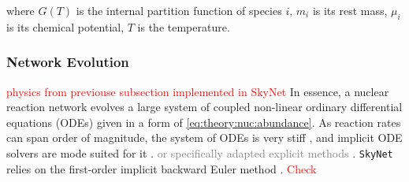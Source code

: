 \documentclass[11pt,a4paper,headinclude=true,DIV=14,BCOR=8mm,chapterprefix,listof=totoc,twoside,openright,abstracton]{scrbook}
\newcommand{\red}[1]{\textcolor{red}{#1}}
\newcommand{\gray}[1]{\textcolor{gray}{#1}}
\begin{document}
where $G(T)$ is the internal partition function of species $i$, $m_i$ is its rest mass, $\mu_i$ is its chemical potential, $T$ is the temperature.


\subsubsection{Network Evolution}
\red{physics from previouse subsection implemented in SkyNet}
In essence, a nuclear reaction network evolves a large system of coupled non-linear ordinary differential equations (ODEs) given in a form of \eqref{eq:theory:nuc:abundance}. As reaction rates can span order of magnitude, the system of ODEs is very stiff \cite{Timmes:1999,Hix:2005pf}, and implicit ODE solvers are mode suited for it \cite{Timmes:1999,Winteler:2012,Longland:2014}. \gray{or specifically adapted explicit methods \cite{Feger:2011,Guidry:2011,Guidry:2012,Guidry:2011a,Guidry:2011b,Brock:2015}}. 
\texttt{SkyNet} relies on the first-order implicit backward Euler method \cite{Hix:1999}. \red{Check}
\end{document}
